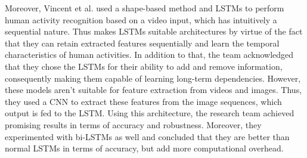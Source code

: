 		Moreover, Vincent et al. used a shape-based method and LSTMs to perform human activity recognition based on a video input, which has intuitively a sequential nature. Thus makes LSTMs suitable architectures by virtue of the fact that they can retain extracted features sequentially and learn the temporal characteristics of human activities. In addition to that, the team acknowledged that they chose the LSTMs for their ability to add and remove information, consequently making them capable of learning long-term dependencies. However, these models aren't suitable for feature extraction from videos and images. Thus, they used a CNN to extract these features from the image sequences, which output is fed to the LSTM. Using this architecture, the research team achieved promising results in terms of accuracy and robustness. Moreover, they experimented with bi-LSTMs as well and concluded that they are better than normal LSTMs in terms of accuracy, but add more computational overhead\cite{vincent2020human}.\newline